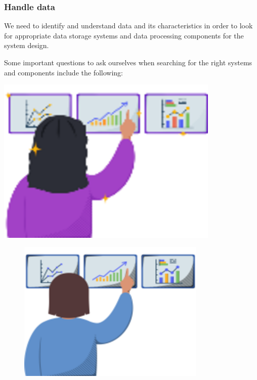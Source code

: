 \subsubsection{Handle data}\label{7i1nhzBRdqWEYT85J2Dpi}

\noindent
\begin{minipage}[t]{0.48\textwidth}
We need to identify and understand data and its characteristics in order to look for appropriate data storage systems and data processing components for the system design.

Some important questions to ask ourselves when searching for the right systems and components include the following:
\end{minipage}
\hfill
\begin{minipage}[t]{0.48\textwidth}
\includegraphics[width=0.8\textwidth]{Images/chapter_1/section_6043988183744512/6050684546449408.png}
\end{minipage}

\begin{figure}[htbp]
 \centering
 \includegraphics[width=0.8\textwidth]{Images/chapter_1/section_6043988183744512/6525031524204544.png}
 
\end{figure}


